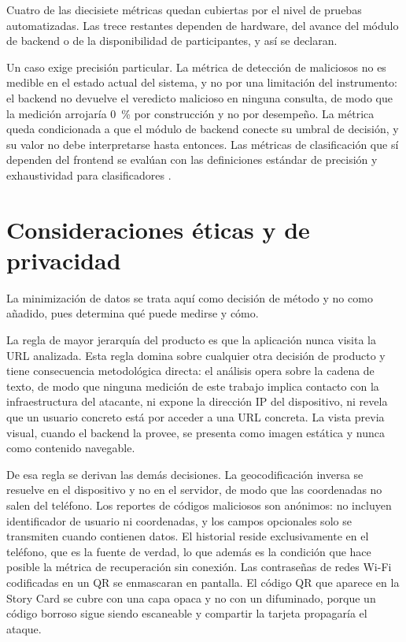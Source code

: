 Cuatro de las diecisiete métricas quedan cubiertas por el nivel de pruebas
automatizadas. Las trece restantes dependen de hardware, del avance del módulo de
backend o de la disponibilidad de participantes, y así se declaran.

Un caso exige precisión particular. La métrica de detección de maliciosos no es medible
en el estado actual del sistema, y no por una limitación del instrumento: el backend no
devuelve el veredicto malicioso en ninguna consulta, de modo que la medición arrojaría
0~\% por construcción y no por desempeño. La métrica queda condicionada a que el
módulo de backend conecte su umbral de decisión, y su valor no debe interpretarse
hasta entonces. Las métricas de clasificación que sí dependen del frontend se evalúan
con las definiciones estándar de precisión y exhaustividad para clasificadores
\cite{sokolova2009systematic}.

\section{Consideraciones éticas y de privacidad}

La minimización de datos se trata aquí como decisión de método y no como añadido, pues
determina qué puede medirse y cómo.

La regla de mayor jerarquía del producto es que la aplicación nunca visita la URL
analizada. Esta regla domina sobre cualquier otra decisión de producto y tiene
consecuencia metodológica directa: el análisis opera sobre la cadena de texto, de modo
que ninguna medición de este trabajo implica contacto con la infraestructura del
atacante, ni expone la dirección IP del dispositivo, ni revela que un usuario concreto
está por acceder a una URL concreta. La vista previa visual, cuando el backend la
provee, se presenta como imagen estática y nunca como contenido navegable.

De esa regla se derivan las demás decisiones. La geocodificación inversa se resuelve en
el dispositivo y no en el servidor, de modo que las coordenadas no salen del teléfono.
Los reportes de códigos maliciosos son anónimos: no incluyen identificador de usuario
ni coordenadas, y los campos opcionales solo se transmiten cuando contienen datos. El
historial reside exclusivamente en el teléfono, que es la fuente de verdad, lo que
además es la condición que hace posible la métrica de recuperación sin conexión. Las
contraseñas de redes Wi-Fi codificadas en un QR se enmascaran en pantalla. El código
QR que aparece en la Story Card se cubre con una capa opaca y no con un difuminado,
porque un código borroso sigue siendo escaneable y compartir la tarjeta propagaría el
ataque.

